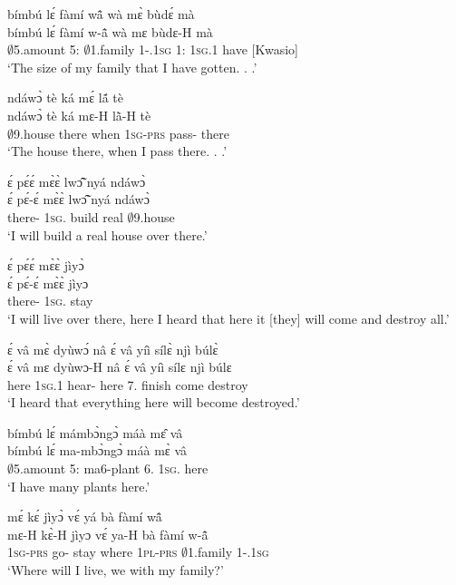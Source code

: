 \begin{exe}[(C234)]
\exC\label{58} 
  \glll   bímbú lɛ́ fàmí wã̂ wà mɛ̀ bùdɛ́ mà\\
           bímbú lɛ́ fàmí w-ã̂ wà mɛ bùdɛ-H mà\\
           $\emptyset$5.amount 5:{\ATT}  $\emptyset$1.family 1-{\POSS}.1\textsc{sg} 1:{\ATT}  1\textsc{sg}.{\PST}1 have {\COMPL}[Kwasio]\\
    \trans `The size of my family that I have gotten. . .'
 
\exC\label{59}
  \glll  ndáwɔ̀ tè ká mɛ́ lã́ tè  \\
         ndáwɔ̀ tè ká mɛ-H lã̀-H tè  \\
           $\emptyset$9.house there when 1\textsc{sg}-\textsc{prs} pass-{\R} there  \\
    \trans `The house there, when I pass there. . .'
 
\exC\label{60} 
  \glll  ɛ́ pɛ́ɛ́ mɛ̀ɛ̀ lwɔ̃̂ nyá ndáwɔ̀ \\
         ɛ́ pɛ́-ɛ́ mɛ̀ɛ̀ lwɔ̃̂ nyá ndáwɔ̀ \\
          {\LOC} there-{\DIST} 1\textsc{sg}.{\FUT} build real $\emptyset$9.house \\
    \trans `I will build a real house over there.'
 
\exC\label{61}
  \glll  ɛ́ pɛ́ɛ́ mɛ̀ɛ̀ jìyɔ̀ \\
         ɛ́ pɛ́-ɛ́ mɛ̀ɛ̀ jìyɔ \\
          {\LOC} there-{\DIST} 1\textsc{sg}.{\FUT} stay \\
    \trans `I will live over there, here I heard that here it [they] will come and destroy all.'
 
\exC\label{62}
  \glll  ɛ́ vâ mɛ̀ dyùwɔ́ nâ ɛ́ vâ yíì sílɛ̀ njì búlɛ̀\\
        ɛ́ vâ mɛ dyùwɔ-H nâ ɛ́ vâ yíì sílɛ njì búlɛ\\
         {\LOC} here 1\textsc{sg}.{\PST}1 hear-{\R} {\COMP} {\LOC} here 7.{\FUT} finish come destroy\\
    \trans `I heard that everything here will become destroyed.'
 
\exC\label{63}
  \glll  bímbú lɛ́ mámbɔ̀ngɔ̀ máà mɛ̂ vâ \\
        bímbú lɛ́ ma-mbɔ̀ngɔ̀ máà mɛ̀ vâ \\
           $\emptyset$5.amount 5:{\ATT}  ma6-plant 6.{\COP} 1\textsc{sg}.{\OBJ} here  \\
    \trans `I have many plants here.'
 
\exC\label{64}
  \glll  mɛ́ kɛ́ jìyɔ̀ vɛ́ yá bà fàmí wã̂ \\
          mɛ-H kɛ̀-H jìyɔ vɛ́ ya-H bà fàmí w-ã̂ \\
            1\textsc{sg}-\textsc{prs} go-{\R} stay where 1\textsc{pl}-\textsc{prs} {\AP} $\emptyset$1.family 1-{\POSS}.1\textsc{sg} \\
    \trans `Where will I live, we with my family?'
\end{exe}

